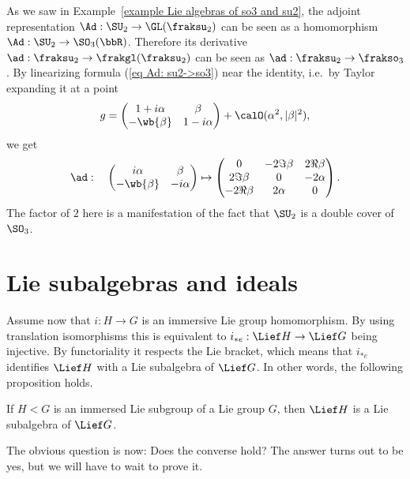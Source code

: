 \begin{example}
    As we saw in Example~\ref{example Lie algebras of so3 and su2}, the adjoint representation $\Ad:\SU_2\to \GL(\fraksu_2)$ can be seen as a homomorphism $\Ad:\SU_2\to \SO_3(\bbR)$. Therefore its derivative $\ad:\fraksu_2\to \frakgl(\fraksu_2)$ can be seen as $\ad:\fraksu_2\to \frakso_3$. By linearizing formula (\ref{eq Ad: su2->so3}) near the identity, i.e.~by Taylor expanding it at a point
    \[g=
    \begin{pmatrix}
        1+i\alpha &\beta \\
        -\wb{\beta} & 1-i\alpha
    \end{pmatrix}+\calO(\alpha^2,|\beta|^2),
    \]
    we get 
    \[\ad:\quad \begin{pmatrix}
        i\alpha&\beta\\-\wb{\beta}&-i\alpha
    \end{pmatrix}\mapsto 
    \begin{pmatrix}
        0&-2\Im \beta & 2\Re\beta\\
        2\Im \beta & 0 & -2\alpha \\
        -2\Re\beta & 2\alpha & 0
    \end{pmatrix}.\label{eq ad: su2->so3}\]
    The factor of $2$ here is a manifestation of the fact that $\SU_2$ is a double cover of $\SO_3$.
\end{example}








\section{Lie subalgebras and ideals}

Assume now that $i:H\to G$ is an immersive Lie group homomorphism. By using translation isomorphisms this is equivalent to $i_{\ast e}:\Lief H\to \Lief G$ being injective. By functoriality it respects the Lie bracket, which means that $i_{\ast e}$ identifies $\Lief H$ with a Lie subalgebra of $\Lief G$. In other words, the following proposition holds.

\begin{prop}
    If $H<G$ is an immersed Lie subgroup of a Lie group $G$, then $\Lief H$ is a Lie subalgebra of $\Lief G$.
\end{prop}

The obvious question is now: Does the converse hold? The answer turns out to be yes, but we will have to wait to prove it.

